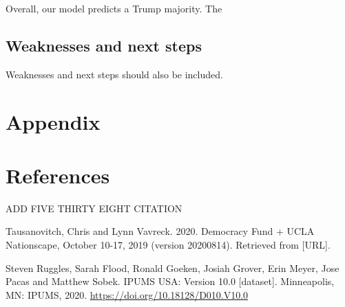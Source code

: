 \documentclass[
]{article}
\begin{document}
Overall, our model predicts a Trump majority. The

\hypertarget{weaknesses-and-next-steps}{%
\subsection{Weaknesses and next steps}\label{weaknesses-and-next-steps}}

Weaknesses and next steps should also be included.

\newpage

\hypertarget{appendix}{%
\section*{Appendix}\label{appendix}}

\newpage

\hypertarget{references}{%
\section{References}\label{references}}

ADD FIVE THIRTY EIGHT CITATION

Tausanovitch, Chris and Lynn Vavreck. 2020. Democracy Fund + UCLA Nationscape, October 10-17, 2019 (version 20200814). Retrieved from {[}URL{]}.

Steven Ruggles, Sarah Flood, Ronald Goeken, Josiah Grover, Erin Meyer, Jose Pacas and Matthew Sobek. IPUMS USA: Version 10.0 {[}dataset{]}. Minneapolis, MN: IPUMS, 2020. \url{https://doi.org/10.18128/D010.V10.0}

  
\end{document}
